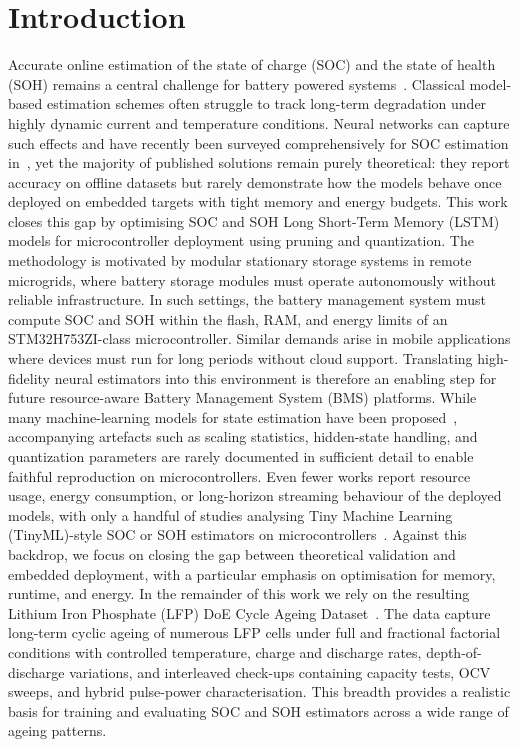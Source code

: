 \documentclass[review]{elsarticle}
\begin{document}
\normalsize
\section{Introduction}
Accurate online estimation of the state of charge (SOC) and the state of health (SOH) remains a central challenge for battery powered systems~\cite{yaoSmarterBatteryManagement2025a,a.m.s.m.h.s.attanayakaEstimationStateCharge2019,berecibarCriticalReviewState2016,shrivastavaReviewTechnologicalAdvancement2023}. Classical model-based estimation schemes often struggle to track long-term degradation under highly dynamic current and temperature conditions. Neural networks can capture such effects and have recently been surveyed comprehensively for SOC estimation in~\cite{yaoSmarterBatteryManagement2025a}, yet the majority of published solutions remain purely theoretical: they report accuracy on offline datasets but rarely demonstrate how the models behave once deployed on embedded targets with tight memory and energy budgets. This work closes this gap by optimising SOC and SOH Long Short-Term Memory (LSTM) models for microcontroller deployment using pruning and quantization.
The methodology is motivated by modular stationary storage systems in remote microgrids, where battery storage modules must operate autonomously without reliable infrastructure. In such settings, the battery management system must compute SOC and SOH within the flash, RAM, and energy limits of an STM32H753ZI-class microcontroller. Similar demands arise in mobile applications where devices must run for long periods without cloud support. Translating high-fidelity neural estimators into this environment is therefore an enabling step for future resource-aware Battery Management System (BMS) platforms.
While many machine-learning models for state estimation have been proposed~\cite{yaoSmarterBatteryManagement2025a}, accompanying artefacts such as scaling statistics, hidden-state handling, and quantization parameters are rarely documented in sufficient detail to enable faithful reproduction on microcontrollers. Even fewer works report resource usage, energy consumption, or long-horizon streaming behaviour of the deployed models, with only a handful of studies analysing Tiny Machine Learning (TinyML)-style SOC or SOH estimators on microcontrollers~\cite{crocioniLiIonBatteriesParameter2020,Embedded_AI_only_SOC_mobile,Embedded_AI_SOH_badData}. Against this backdrop, we focus on closing the gap between theoretical validation and embedded deployment, with a particular emphasis on optimisation for memory, runtime, and energy.
In the remainder of this work we rely on the resulting Lithium Iron Phosphate (LFP) DoE Cycle Ageing Dataset~\cite{LFP_DoE_Cycle_Aging_Dataset}. The data capture long-term cyclic ageing of numerous LFP cells under full and fractional factorial conditions with controlled temperature, charge and discharge rates, depth-of-discharge variations, and interleaved check-ups containing capacity tests, OCV sweeps, and hybrid pulse-power characterisation. This breadth provides a realistic basis for training and evaluating SOC and SOH estimators across a wide range of ageing patterns.
\end{document}

